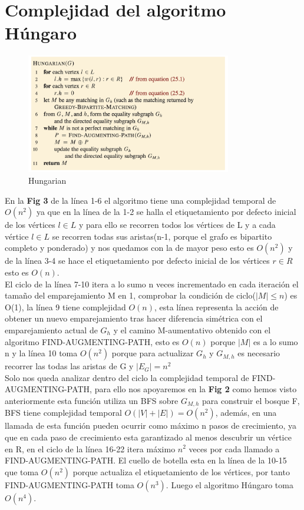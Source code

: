 \documentclass[sn-mathphys,Numbered]{sn-jnl}%
\theoremstyle{thmstyleone}%
\theoremstyle{thmstyletwo}%
\theoremstyle{thmstylethree}%
\begin{document}
\section*{Complejidad del algoritmo Húngaro}
 \begin{figure}[htb]
        \centering
        \includegraphics[width=0.8\textwidth]{Screenshot 2023-04-03 at 1.16.57 AM.png}
        \centering
        \caption{Hungarian\cite{6}}
    \end{figure}
En la \textbf{Fig 3} de la l\'inea 1-6 el algoritmo tiene una complejidad temporal de $O(n^2)$ ya que en la l\'inea de la 1-2  se halla el etiquetamiento  por defecto inicial  de los vértices $l\in L$ y para ello se recorren todos los vértices de L y a cada vértice $l\in L$ se recorren todas sus aristas(n-1, porque el grafo es bipartito completo y ponderado) y nos quedamos con la de mayor peso esto es $O(n^2)$ y de la l\'inea 3-4 se hace el etiquetamiento  por defecto inicial  de los vértices $r\in R$ esto es  $O(n)$.\\
El ciclo de la l\'inea 7-10 itera a lo sumo n veces incrementado en cada iteración el tama\~no del emparejamiento M en 1, comprobar la condición de ciclo($|M| \leq n$) es O(1), la l\'inea 9 tiene complejidad $O(n)$, esta l\'inea representa la acción de obtener un nuevo emparejamiento tras hacer diferencia simétrica con el emparejamiento actual de $G_h$ y el camino M-aumentativo obtenido con el algoritmo FIND-AUGMENTING-PATH, esto es $O(n)$ porque $|M|$ es a lo sumo n y la l\'inea 10 toma $O(n^2)$ porque para actualizar $G_h$ y $G_{M,h}$ es necesario recorrer las todas las aristas de G y $|E_G| = n^2$\\
Solo nos queda analizar dentro del ciclo la complejidad temporal de FIND-AUGMENTING-PATH, para ello nos apoyaremos en la \textbf{Fig 2} como hemos visto anteriormente esta función utiliza un BFS sobre $G_{M,h}$ para construir el bosque F, BFS tiene complejidad temporal $O(|V| + |E|) = O(n^2)$, además, en una llamada de esta función pueden ocurrir como máximo n pasos de crecimiento, ya que en cada paso de crecimiento esta garantizado al menos descubrir un vértice en R, en el ciclo de la l\'inea 16-22 itera máximo $n^2$ veces por cada llamado a  FIND-AUGMENTING-PATH. El cuello de botella esta en la l\'inea de la 10-15 que toma $O(n^2)$ porque actualiza el etiquetamiento de los vértices, por tanto FIND-AUGMENTING-PATH toma $O(n^3)$.
Luego el algoritmo Húngaro toma $O(n^4)$.
 
\end{document}
